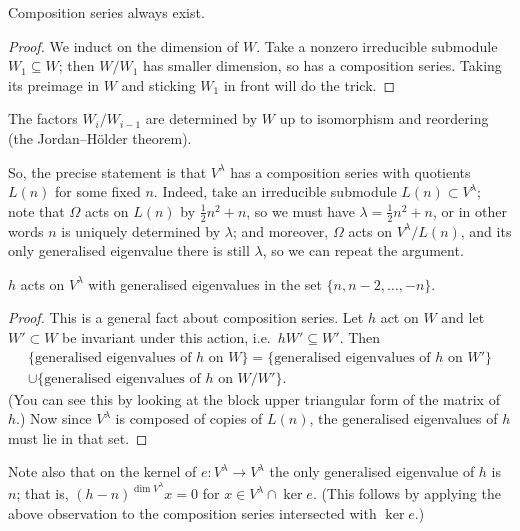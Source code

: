\begin{lemma}
Composition series always exist.
\end{lemma}

\begin{proof}
We induct on the dimension of $W$. Take a nonzero irreducible submodule
$W_1 \subseteq W$; then $W/W_1$ has smaller dimension, so has a composition
series. Taking its preimage in $W$ and sticking $W_1$ in front will do the
trick.
\end{proof}

\begin{remark}
The factors $W_i/W_{i-1}$ are determined by $W$ up to isomorphism and
reordering (the Jordan--H\"older theorem).
\end{remark}

So, the precise statement is that $V^\lambda$ has a composition series with
quotients $L(n)$ for some fixed $n$. Indeed, take an irreducible submodule
$L(n) \subset V^\lambda$; note that $\Omega$ acts on $L(n)$ by
$\frac12 n^2 + n$, so we must have $\lambda = \frac12 n^2 + n$, or in other
words $n$ is uniquely determined by $\lambda$; and moreover, $\Omega$ acts on
$V^\lambda/L(n)$, and its only generalised eigenvalue there is still
$\lambda$, so we can repeat the argument.

\begin{claim}
$h$ acts on $V^\lambda$ with generalised eigenvalues in the set
$\{n, n - 2, \dots, -n\}$.
\end{claim}

\begin{proof}
This is a general fact about composition series. Let $h$ act on $W$ and let
$W' \subset W$ be invariant under this action, i.e.\ $hW' \subseteq W'$. Then
\begin{multline*}
  \{\text{generalised eigenvalues of } h \text{ on } W\}
  = \{\text{generalised eigenvalues of } h \text{ on } W'\}\\
  \cup \{\text{generalised eigenvalues of } h \text{ on } W/W'\}.
\end{multline*}
(You can see this by looking at the block upper triangular form of the matrix
of $h$.) Now since $V^\lambda$ is composed of copies of $L(n)$, the generalised
eigenvalues of $h$ must lie in that set.
\end{proof}

Note also that on the kernel of $e\colon V^\lambda \to V^\lambda$ the only
generalised eigenvalue of $h$ is $n$; that is, $(h - n)^{\dim V^\lambda}x = 0$
for $x \in V^\lambda \cap \ker e$. (This follows by applying the above
observation to the composition series intersected with $\ker e$.)

